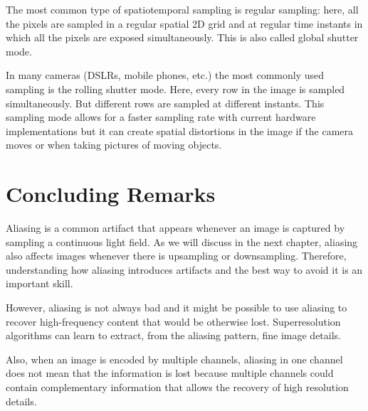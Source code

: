 
The most common type of spatiotemporal sampling is regular sampling: here, all the pixels are sampled in a regular spatial 2D grid and at regular time instants in which all the pixels are exposed simultaneously. This is also called global shutter mode.

In many cameras (DSLRs, mobile phones, etc.) the most commonly used sampling is the rolling shutter mode. Here, every row in the image is sampled simultaneously. But different rows are sampled at different instants. This sampling mode allows for a faster sampling rate with current hardware implementations but it can create spatial distortions in the image if the camera moves or when taking pictures of moving objects.

%
%
%
%




\section{Concluding Remarks}

Aliasing is a common artifact that appears whenever an image is captured by sampling a continuous light field. As we will discuss in the next chapter, aliasing also affects images whenever there is upsampling or downsampling. Therefore, understanding how aliasing introduces artifacts and the best way to avoid it is an important skill.

However, aliasing is not always bad and it might be possible to use aliasing to recover high-frequency content that would be otherwise lost. Superresolution algorithms can learn to extract, from the aliasing pattern, fine image details.

Also, when an image is encoded by multiple channels, aliasing in one channel does not mean that the information is lost because multiple channels could contain complementary information that allows the recovery of high resolution details.

